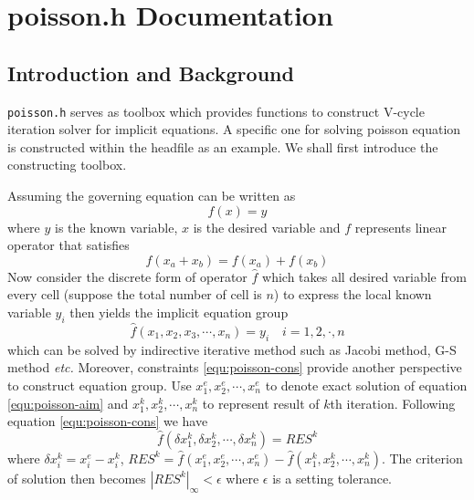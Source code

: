 \chapter{poisson.h Documentation}
\ifsingle
\maketitle
\fi
\chaptermeta[1.0][2025-06-07]

\section{Introduction and Background}\label{sec:poisson-intro}
\texttt{poisson.h} serves as toolbox which provides functions to construct V-cycle iteration solver for implicit equations. A specific one for solving poisson equation is constructed within the headfile as an example. We shall first introduce the constructing toolbox.\par
Assuming the governing equation can be written as
\begin{equation}
  f( x) = y
\end{equation}
where $y$ is the known variable, $ x$ is the desired variable and $f$ represents linear operator that satisfies
\begin{equation}\label{equ:poisson-cons}
  f( x_a+ x_b) = f( x_a) + f( x_b)
\end{equation}
Now consider the discrete form of operator $\hat{f}$ which takes all desired variable from every cell (suppose the total number of cell is $n$) to express the local known variable $y_i$ then yields the implicit equation group
\begin{equation}\label{equ:poisson-aim}
  \hat{f}(x_1,x_2,x_3,\cdots,x_n) = y_i \quad i = 1,2,\cdot,n
\end{equation}
which can be solved by indirective iterative method such as Jacobi method, G-S method\cite{2010_Moin} \emph{etc.} Moreover, constraints \ref{equ:poisson-cons} provide another perspective to construct equation group. Use $x_1^e,x_2^e,\cdots,x_n^e$ to denote exact solution of equation \ref{equ:poisson-aim} and $x_1^k,x_2^k,\cdots,x_n^k$ to represent result of $k$th iteration. Following equation \ref{equ:poisson-cons} we have
\begin{equation}\label{equ:poisson-iter}
  \hat{f}(\delta x_1^k,\delta x_2^k,\cdots, \delta x_n^k) = RES^k
\end{equation}
where $\delta x_i^k = x_i^e - x_i^k$, $RES^k = \hat{f}(x_1^e,x_2^e,\cdots,x_n^e) - \hat{f}(x_1^k,x_2^k,\cdots,x_n^k)$. The criterion of solution then becomes $|RES^k|_{\infty}<\epsilon$ where $\epsilon$ is a setting tolerance.\par
